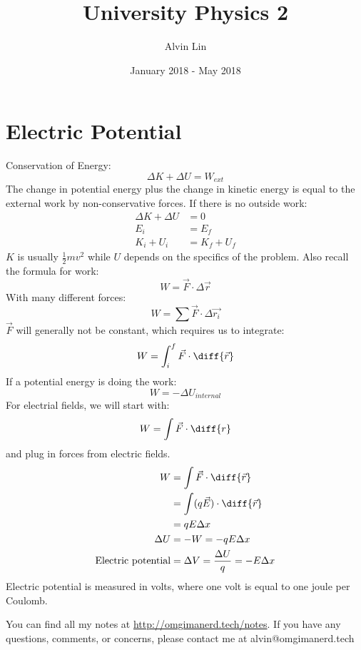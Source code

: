 \documentclass{math}
\title{University Physics 2}
\author{Alvin Lin}
\date{January 2018 - May 2018}
\begin{document}
\maketitle

\section*{Electric Potential}
Conservation of Energy:
\[ \Delta K+\Delta U = W_{ext} \]
The change in potential energy plus the change in kinetic energy is equal to
the external work by non-conservative forces. If there is no outside work:
\begin{align*}
  \Delta K+\Delta U &= 0 \\
  E_i &= E_f \\
  K_i+U_i &= K_f+U_f
\end{align*}
\( K \) is usually \( \frac{1}{2}mv^2 \) while \( U \) depends on the specifics
of the problem. Also recall the formula for work:
\[ W = \vec{F}\cdot\Delta\vec{r} \]
With many different forces:
\[ W = \sum\vec{F}\cdot\Delta\vec{r_i} \]
\( \vec{F} \) will generally not be constant, which requires us to integrate:
\[ W = \int_{i}^{f}\vec{F}\cdot\diff{\vec{r}} \]
If a potential energy is doing the work:
\[ W = -\Delta U_{internal} \]
For electrial fields, we will start with:
\[ W = \int\vec{F}\cdot\diff{r} \]
and plug in forces from electric fields.
\begin{align*}
  W &= \int\vec{F}\cdot\diff{\vec{r}} \\
  &= \int(q\vec{E})\cdot\diff{\vec{r}} \\
  &= qE\Delta x \\
  \Delta U &= -W = -qE\Delta x \\
  \text{Electric potential} &= \Delta V = \frac{\Delta U}{q} = -E\Delta x
\end{align*}
Electric potential is measured in volts, where one volt is equal to one joule
per Coulomb.

\begin{center}
  You can find all my notes at \url{http://omgimanerd.tech/notes}. If you have
  any questions, comments, or concerns, please contact me at
  alvin@omgimanerd.tech
\end{center}
\end{document}

